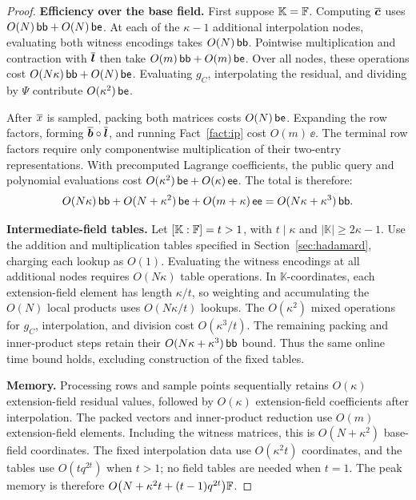 \begin{proof}
\smallskip\noindent\textbf{Efficiency over the base field.}
First suppose \(\mathbb K={\mathbb{F}}\).
Computing \(\overline{\bm c}\) uses \(O(N)\,\mathsf{bb}+O(N)\,\mathsf{be}\).
At each of the \(\kappa-1\) additional interpolation nodes,
evaluating both witness encodings takes \(O(N)\,\mathsf{bb}\).
Pointwise multiplication and contraction with \(\overline{\bm l}\)
then take \(O(m)\,\mathsf{bb}+O(m)\,\mathsf{be}\).
Over all nodes, these operations cost
\(O(N\kappa)\,\mathsf{bb}+O(N)\,\mathsf{be}\).
Evaluating \(g_C\), interpolating the residual, and dividing by
\(\Psi\) contribute \(O(\kappa^2)\,\mathsf{be}\).

After \(\overline{x}\) is sampled, packing both matrices costs
\(O(N)\,\mathsf{be}\).
Expanding the row factors, forming
\(\overline{\bm b}\circ\overline{\bm l}\), and running Fact~\ref{fact:ip}
cost \(O(m)\,\ee\).
The terminal row factors require only componentwise
multiplication of their two-entry representations.
With precomputed Lagrange coefficients, the public query
and polynomial evaluations cost
\(O(\kappa^2)\,\mathsf{be}+O(\kappa)\,\mathsf{ee}\).
The total is therefore:
\[
    O(N\kappa)\,\mathsf{bb}
      +O(N+\kappa^2)\,\mathsf{be}
      +O(m+\kappa)\,\mathsf{ee}
      =O(N\kappa+\kappa^3)\,\mathsf{bb}.
\]

\smallskip\noindent\textbf{Intermediate-field tables.}
Let \([\mathbb K:{\mathbb{F}}]=t>1\), with \(t\mid\kappa\) and
\(|\mathbb K|\geq2\kappa-1\).
Use the addition and multiplication tables specified in
Section~\ref{sec:hadamard}, charging each lookup as \(O(1)\).
Evaluating the witness encodings at all additional nodes
requires \(O(N\kappa)\) table operations.
In \(\mathbb K\)-coordinates, each extension-field element
has length \(\kappa/t\), so weighting and accumulating the
\(O(N)\) local products uses \(O(N\kappa/t)\) lookups.
The \(O(\kappa^2)\) mixed operations for \(g_C\), interpolation,
and division cost \(O(\kappa^3/t)\).
The remaining packing and inner-product steps retain their
\(O(N\kappa+\kappa^3)\,\mathsf{bb}\) bound. Thus the same online
time bound holds, excluding construction of the fixed tables.

\smallskip\noindent\textbf{Memory.}
Processing rows and sample points sequentially retains
\(O(\kappa)\) extension-field residual values, followed by
\(O(\kappa)\) extension-field coefficients after interpolation.
The packed vectors and inner-product reduction use \(O(m)\)
extension-field elements. Including the witness matrices,
this is \(O(N+\kappa^2)\) base-field coordinates.
The fixed interpolation data use \(O(\kappa^2t)\)
coordinates, and the tables use \(O(tq^{2t})\) when \(t>1\);
no field tables are needed when \(t=1\).
The peak memory is therefore
\(O\bigl(N+\kappa^2t+(t-1)q^{2t}\bigr){\mathbb{F}}\).
\end{proof}

